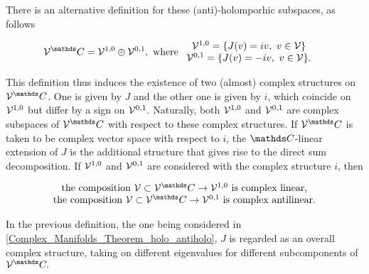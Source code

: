 \begin{remark}
    \textnormal{There is an alternative definition for these (anti)-holomporhic subspaces, as follows}
        
        \begin{equation}         
            \begin{split}
            &\vectorspace^\C = \vectorspace^{1,0} \oplus \vectorspace^{0,1}, \textnormal{ where }\begin{array}{cc} 
                \vectorspace^{1,0} = \{ J(v) = i v, \blanky v \in \vectorspace\}  \\ 
                \vectorspace^{0,1} = \{J(v) = - i v, \blanky v \in \vectorspace\}.
            \end{array}
            \end{split} 
        \end{equation}
    
    \textnormal{
    This definition thus induces the existence of two (almost) complex structures on $\vectorspace^\C$. 
    One is given by $J$ and the other one is given by $i$, which coincide on $\mathcal{V}^{1,0}$ but differ by a sign on $\mathcal{V}^{0,1}$. 
    Naturally, both $\mathcal{V}^{1,0}$ and $\mathcal{V}^{0,1}$ are complex subspaces of $\vectorspace^\C$ with respect to these complex structures.
    }\textnormal{
    If $\vectorspace^\C$ is taken to be complex vector space with respect to $i$, the $\C$-linear extension of $J$ is the additional structure that gives rise to the direct sum decomposition. If $\mathcal{V}^{1,0}$ and $\mathcal{V}^{0,1}$ are considered with the complex structure $i$, then
    } 
    
    \begin{equation*}
        \begin{array}{cc}
             \textnormal{the composition } \vectorspace \subset \vectorspace^\C \rightarrow \vectorspace^{1,0} \textnormal{ is complex linear,}  \\
             \textnormal{the composition } \vectorspace \subset \vectorspace^\C \rightarrow \vectorspace^{0,1} \textnormal{ is complex antilinear.} 
        \end{array}
    \end{equation*}
    
    \textnormal{
    In the previous definition, the one being considered in \cref{Complex_Manifolds_Theorem_holo_antiholo}, $J$ is regarded as an overall complex structure, taking on different eigenvalues for different subcomponents of $\vectorspace^\C.$
    }
    
\end{remark}

